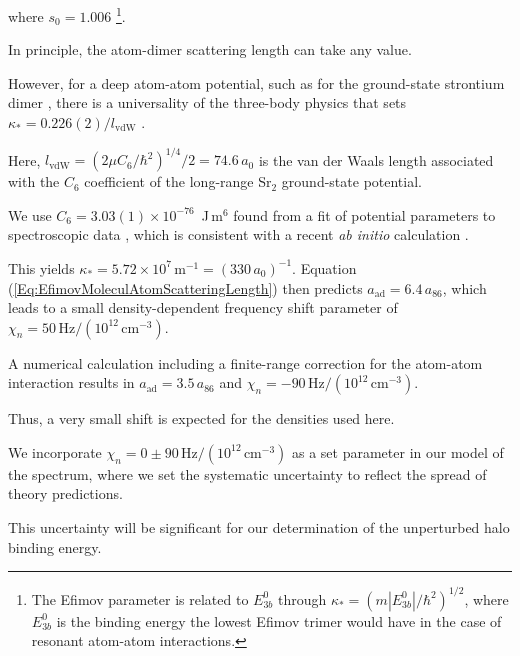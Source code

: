 where $s_0=1.006$ \footnote{The Efimov parameter is related to $E^0_{3b}$ through $\kappa_*=(m|E^0_{3b}|/\hbar^2)^{1/2}$, where $E^0_{3b}$ is the binding energy the lowest Efimov trimer would have in the case of resonant atom-atom interactions.}.

In principle, the atom-dimer scattering length can take any value.

However, for a deep atom-atom potential, such as for the ground-state strontium dimer \cite{skt10}, there is a universality of the three-body physics that sets $\kappa_*=0.226(2)/l_{\mathrm{vdW}}$ \cite{wie12}.

Here, $l_{\mathrm{vdW}}=\left({2\mu C_6}/{\hbar^2}\right)^{1/4}/2=74.6$\,$a_0$ is the van der Waals length associated with the $C_6$ coefficient of the long-range Sr$_2$ ground-state potential.

We use $C_6=3.03(1) \times 10^{-76}$\, J\,m$^6$ found from a fit of potential parameters to spectroscopic data \cite{skt10}, which is consistent with a recent \textit{ab initio} calculation \cite{zbb14}.

This yields $\kappa_*=5.72\times 10^7$\,m$^{-1}=(330\,a_0)^{-1}$. Equation (\ref{Eq:EfimovMoleculAtomScatteringLength}) then predicts $a_{\text{ad}}=6.4\, a_{86}$, which leads to a small density-dependent frequency shift parameter of $\chi_n=50\,\mathrm{Hz}/(10^{12}\,\mathrm{cm}^{-3})$.

A numerical calculation including a finite-range correction for the atom-atom interaction \cite{mwc17} results in $a_{\text{ad}}=3.5\, a_{86}$ and $\chi_n=-90\,\mathrm{Hz}/(10^{12}\,\mathrm{cm}^{-3})$.

Thus, a very small shift is expected for the densities used here.

We incorporate $\chi_n=0\pm 90 \,\mathrm{Hz}/(10^{12}\,\mathrm{cm}^{-3})$ as a set parameter in our model of the spectrum, where we set the systematic uncertainty to reflect the spread of theory predictions.

This uncertainty will be significant for our determination of the unperturbed halo binding energy.



